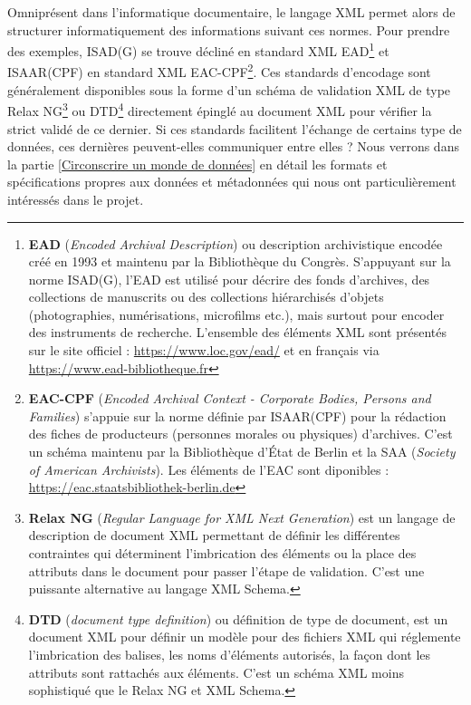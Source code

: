 Omniprésent dans l'informatique documentaire, le langage XML permet alors de structurer informatiquement des informations suivant ces normes. Pour prendre des exemples, ISAD(G) se trouve décliné en standard XML EAD\footnote{\textbf{EAD} (\textit{Encoded Archival Description}) ou description archivistique encodée créé en 1993 et maintenu par la Bibliothèque du Congrès. S'appuyant sur la norme ISAD(G), l'EAD est utilisé pour décrire des fonds d'archives, des collections de manuscrits ou des collections hiérarchisés d'objets (photographies, numérisations, microfilms etc.), mais surtout pour encoder des instruments de recherche. L'ensemble des éléments XML sont présentés sur le site officiel : \url{https://www.loc.gov/ead/} et en français via \url{https://www.ead-bibliotheque.fr}} et ISAAR(CPF) en standard XML EAC-CPF\footnote{\textbf{EAC-CPF} (\textit{Encoded Archival Context - Corporate Bodies, Persons and Families}) s'appuie sur la norme définie par ISAAR(CPF) pour la rédaction des fiches de producteurs (personnes morales ou physiques) d'archives. C'est un schéma maintenu par la Bibliothèque d'État de Berlin et la SAA (\textit{Society of American Archivists}). Les éléments de l'EAC sont diponibles : \url{https://eac.staatsbibliothek-berlin.de}}. Ces standards d'encodage sont généralement disponibles sous la forme d'un schéma de validation XML de type Relax NG\footnote{\textbf{Relax NG} (\textit{Regular Language for XML Next Generation}) est un langage de description de document XML permettant de définir les différentes contraintes qui déterminent l'imbrication des éléments ou la place des attributs dans le document pour passer l'étape de validation. C'est une puissante alternative au langage XML Schema.} ou DTD\footnote{\textbf{DTD} (\textit{document type definition}) ou définition de type de document, est un document XML pour définir un modèle pour des fichiers XML qui réglemente l’imbrication des balises, les noms d’éléments autorisés, la façon dont les attributs sont rattachés aux éléments. C'est un schéma XML moins sophistiqué que le Relax NG et XML Schema.} directement épinglé au document XML pour vérifier la strict validé de ce dernier. 
Si ces standards facilitent l'échange de certains type de données, ces dernières peuvent-elles communiquer entre elles ? Nous verrons dans la partie \ref{Circonscrire un monde de données} en détail les formats et spécifications propres aux données et métadonnées qui nous ont particulièrement intéressés dans le projet. 


